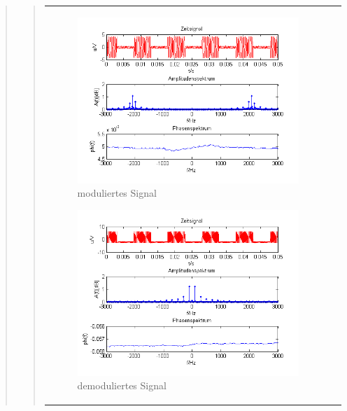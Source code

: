 \begin{quote}
\begin{quote}
\begin{center}
\begin{tabular}{ll}
\begin{minipage}{0.67\textwidth}
                \begin{figure}[H]
                    \label{fig:DemorechteckoT}
                    \includegraphics[scale=0.7]{Bilder/Am_Rec_2k_100Hz_mo}
                    \caption{moduliertes Signal}
                \end{figure}
        
            \end{minipage}
        
            \begin{minipage}{0.67\textwidth}
                \begin{figure}[H]
                    \label{fig:DemorechteckoT2}
                    \includegraphics[scale=0.7]{Bilder/Demo_Rec_2k_100Hz_mo_ohneTiefpass}
                    \caption{demoduliertes Signal}
                \end{figure}
        

\end{minipage}
\end{tabular}
\end{center}
\end{quote}
\end{quote}
